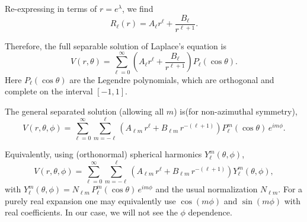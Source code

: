 \documentclass{article}
\begin{document}
Re-expressing in terms of $r = e^\lambda$, we find
\begin{equation*}
R_\ell(r) = A_\ell r^\ell + \frac{B_\ell}{r^{\ell+1}}.
\end{equation*}

Therefore, the full separable solution of Laplace’s equation is
\begin{equation}
V(r,\theta) = \sum_{\ell=0}^\infty 
\left( A_\ell r^\ell + \frac{B_\ell}{r^{\ell+1}} \right) P_\ell(\cos\theta).
\label{laplace_sp_azi_sym_gen_soln}
\end{equation}
Here $P_\ell(\cos\theta)$ are the Legendre polynomials, which are orthogonal and complete on the interval $[-1,1]$.
\begin{note}
    The general separated solution (allowing all $m$) is(for non-azimuthal symmetry),
    \begin{equation}
    V(r,\theta,\phi)=\sum_{\ell=0}^{\infty}\sum_{m=-\ell}^{\ell}
    \left( A_{\ell m}\, r^{\ell} + B_{\ell m}\, r^{-(\ell+1)} \right)
    P_{\ell}^{m}(\cos\theta)\,e^{i m \phi}.
    \end{equation}
    
    \noindent
    Equivalently, using (orthonormal) spherical harmonics $Y_{\ell}^{m}(\theta,\phi)$,
    \begin{equation*}
    V(r,\theta,\phi)=\sum_{\ell=0}^{\infty}\sum_{m=-\ell}^{\ell}
    \left( A_{\ell m}\, r^{\ell} + B_{\ell m}\, r^{-(\ell+1)} \right) Y_{\ell}^{m}(\theta,\phi),
    \end{equation*}
    with $Y_{\ell}^{m}(\theta,\phi)
    = N_{\ell m}\,P_{\ell}^{m}(\cos\theta)\,e^{i m \phi}$ and the usual normalization $N_{\ell m}$.
    For a purely real expansion one may equivalently use $\cos(m\phi)$ and $\sin(m\phi)$
    with real coefficients. In our case, we will not see the $\phi$ dependence. 
\end{note}


\end{document}
